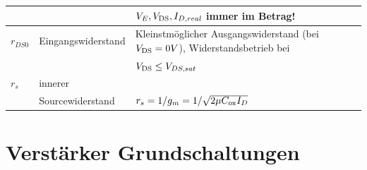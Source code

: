 \begin{tabular}{| l | l | l |}
                    &                       & $V_E, V_{\rm DS}, I_{D,real}$ immer im Betrag! \\
    \hline
    $r_{DS0}$       & Eingangswiderstand    & Kleinstmöglicher Ausgangswiderstand (bei $V_{\rm DS} = 0V$), Widerstandsbetrieb bei\\
                    &                       & $V_{\rm DS} \leq V_{DS,sat}$ \\
    \hline
    $r_s$           & innerer                & \\
                    & Sourcewiderstand       & $r_s = 1/g_m = 1 / \sqrt{2\mu C_{\rm ox} I_D}$\\
    \hline
    \end{tabular}
\section{Verstärker Grundschaltungen }
\renewcommand{\arraystretch}{1.3}
